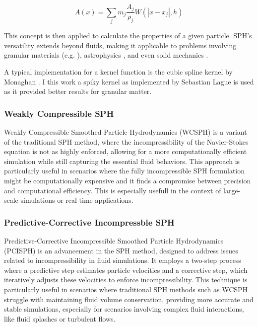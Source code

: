 \documentclass[intern]{cgMA}
\begin{document}
    \begin{equation}
        A(x) = \sum_j m_j \frac{A_j}{\rho_j} W(|x - x_j|, h)
    \end{equation}

    This concept is then applied to calculate the properties of a given particle. SPH's versatility extends beyond fluids, making it applicable to problems involving granular materials (e.g. \cite{10.2312:LocalChapterEvents:CEIG:CEIG09:011-018}), astrophysics \cite{Springel_2010}, and even solid mechanics \cite{solid_mechanics}. 

    A typical implementation for a kernel function is the cubic spline kernel by Monaghan \cite{doi:10.1146/annurev.aa.30.090192.002551}. I this work a spiky kernel as implemented by Sebastian Lague \cite{seblague} is used as it provided better results for granular matter.

    \subsubsection*{Weakly Compressible SPH}
    Weakly Compressible Smoothed Particle Hydrodynamics (WCSPH) is a variant of the traditional SPH method, where the incompressibility of the Navier-Stokes equation is not as highly enforced, allowing for a more computationally efficient simulation while still capturing the essential fluid behaviors. This approach is particularly useful in scenarios where the fully incompressible SPH formulation might be computationally expensive and it finds a compromise between precision and computational efficiency. This is especially usefull in the context of large-scale simulations or real-time applications.\cite{wcsph}

    \subsubsection*{Predictive-Corrective Incompressble SPH} 
    Predictive-Corrective Incompressible Smoothed Particle Hydrodynamics (PCISPH) is an advancement in the SPH method, designed to address issues related to incompressibility in fluid simulations. It employs a two-step process where a predictive step estimates particle velocities and a corrective step, which iteratively adjusts these velocities to enforce incompressibility. This technique is particularly useful in scenarios where traditional SPH methods such as WCSPH struggle with maintaining fluid volume conservation, providing more accurate and stable simulations, especially for scenarios involving complex fluid interactions, like fluid splashes or turbulent flows. \cite{10.1145/1576246.1531346}
\end{document}
